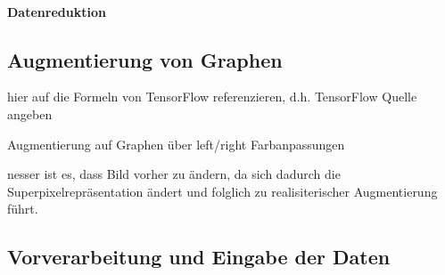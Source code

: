 \paragraph{Datenreduktion}
\label{datenreduktion}

\subsection{Augmentierung von Graphen}
\label{augmentierung_von_graphen}

hier auf die Formeln von TensorFlow referenzieren, d.h. TensorFlow Quelle angeben
\cite{tensorflow}

Augmentierung auf Graphen über left/right
Farbanpassungen


nesser ist es, dass Bild vorher zu ändern, da sich dadurch die Superpixelrepräsentation ändert
und folglich zu realisiterischer Augmentierung führt.

\subsection{Vorverarbeitung und Eingabe der Daten}
\label{vorverarbeitung}
